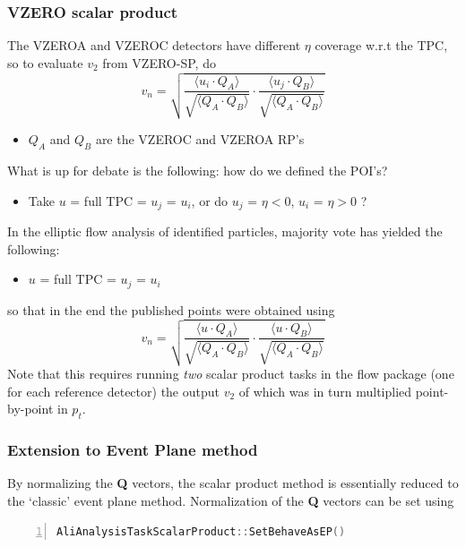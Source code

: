 \documentclass[a4paper]{book}
\numberwithin{equation}{subsection}
\begin{document}
\subsubsection{VZERO scalar product}\label{sec:vzerp_sp}
		
The VZEROA and VZEROC detectors have different $\eta$ coverage w.r.t the TPC, so to evaluate $v_2$ from VZERO-SP, do
\begin{equation}
v_n = \sqrt{\frac{\langle u_i \cdotp Q_A \rangle }{\sqrt{\langle Q_A \cdotp Q_B \rangle}} \cdotp \frac{\langle u_j \cdotp Q_B \rangle }{\sqrt{\langle Q_A \cdotp Q_B \rangle}}}
\end{equation}
\begin{itemize}
\item $Q_A$ and $Q_B$ are the VZEROC and VZEROA RP's
\end{itemize}
What is up for debate is the following: how do we defined the POI's?
\begin{itemize}
\item Take $u$ = full TPC = $u_j$ = $u_i$, or do $u_j$ = $\eta < 0$, $u_i$ = $\eta > 0$ ?
\end{itemize}
In the elliptic flow analysis of identified particles, majority vote has yielded the following:
\begin{itemize}
\item $u$ = full TPC = $u_j$ = $u_i$
\end{itemize}
so that in the end the published points were obtained using
\begin{equation}
v_n = \sqrt{\frac{\langle u \cdotp Q_A \rangle }{\sqrt{\langle Q_A \cdotp Q_B \rangle}} \cdotp \frac{\langle u \cdotp Q_B \rangle }{\sqrt{\langle Q_A \cdotp Q_B \rangle}}}
\end{equation}
Note that this requires running \emph{two} scalar product tasks in the flow package (one for each reference detector) the output $v_2$ of which was in turn multiplied point-by-point in $p_t$. 

\subsubsection{Extension to Event Plane method}
By normalizing the \textbf{Q} vectors, the scalar product method is essentially reduced to the `classic' event plane method. Normalization of the \textbf{Q} vectors can be set using
\begin{lstlisting}[language=C, numbers=left]
AliAnalysisTaskScalarProduct::SetBehaveAsEP()\end{lstlisting}
\end{document}
